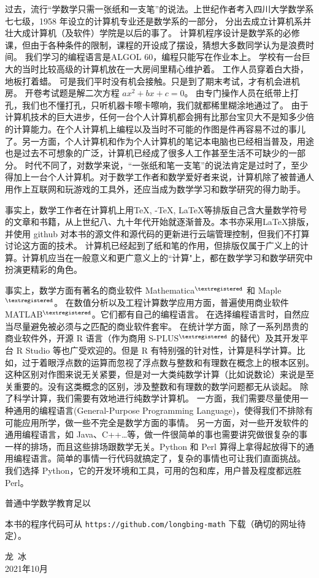 \documentclass[main.tex]{subfiles}
\begin{document}
过去，流行“学数学只需一张纸和一支笔”的说法。上世纪作者考入四川大学数学系七七级，1958 年设立的计算机专业还是数学系的一部分，
分出去成立计算机系并壮大成计算机（及软件）学院是以后的事了。
计算机程序设计是数学系的必修课，但由于各种条件的限制，课程的开设成了摆设，猜想大多数同学认为是浪费时间。
我们学习的编程语言是ALGOL 60，编程只能写在作业本上。
学校有一台巨大的当时比较高级的计算机放在一大房间里精心维护着。
工作人员穿着白大掛，地板打着蜡。
可是我们平时没有机会接触。只是到了期末考试，才有机会进机房。
开卷考试题是解二次方程 $ax^2+bx+c = 0$。
由专门操作人员在纸带上打孔，我们也不懂打孔，只听机器卡嚓卡嚓响，我们就都稀里糊涂地通过了。
由于计算机技术的巨大进步，任何一台个人计算机都会拥有比那台宝贝大不是知多少倍的计算能力。在个人计算机上编程以及当时不可能的作图是件再容易不过的事儿了。另一方面，个人计算机和作为个人计算机的笔记本电脑也已经相当普及，用途也是过去不可想象的广泛，计算机已经成了很多人工作甚至生活不可缺少的一部分。
时代不同了，对数学来说，“一张纸和笔一支笔”的说法肯定是过时了，至少得加上一台个人计算机。对于数学工作者和数学爱好者来说，计算机除了被普通人用作上互联网和玩游戏的工具外，还应当成为数学学习和数学研究的得力助手。

事实上，数学工作者在计算机上用\TeX, \AmS-\TeX, \LaTeX 等排版自己含大量数学符号的文章和书籍，从上世纪八、九十年代开始就逐渐普及。本书亦采用\LaTeX 排版， 并使用 github 对本书的源文件和源代码的更新进行云端管理控制，但我们不打算讨论这方面的技术。
计算机已经起到了纸和笔的作用，但排版仅属于广义上的计算。计算机应当在一般意义和更广意义上的“计算"上，都在数学学习和数学研究中扮演更精彩的角色。

事实上，数学方面有著名的商业软件 Mathematica${}^{\textregistered}$ 和 Maple${}^{\textregistered}$。
在数值分析以及工程计算数学应用方面，普遍使用商业软件 MATLAB${}^{\textregistered}$。它们都有自己的编程语言。
在选择编程语言时，自然应当尽量避免被必须与之匹配的商业软件套牢。
在统计学方面，除了一系列昂贵的商业软件外，开源 R 语言（作为商用 S-PLUS${}^{\textregistered}$ 的替代）及其开发平台 R Studio 等也广受欢迎的。但是 R 有特别强的针对性，计算是科学计算。比如，过于着眼浮点数的运算而忽视了浮点数与整数和有理数在概念上的根本区别。这种区别对作图来说无关紧要，但是对一大类纯数学计算（比如说数论）来说是至关重要的。没有这类概念的区别，涉及整数和有理数的数学问题都无从谈起。
除了科学计算，我们需要有效地进行纯数学计算机。
一方面，我们需要尽量使用一种通用的编程语言(General-Purpose Programming Language)，使得我们不排除有可能应用所学，做一些不完全是数学方面的事情。
另一方面，对一些开发软件的通用编程语言，如 Java、C++…等，做一件很简单的事也需要讲究做很复杂的事一样的排场，而且这些排场跟数学无关。Python 和 Perl 算得上拿得起放得下的通用编程语言。简单的事情一行代码就搞定了，复杂的事情也可让我们直面挑战。
我们选择 Python，它的开发环境和工具，可用的包和库，用户普及程度都远胜Perl。

普通中学数学教育足以


本书的程序代码可从 \verb|https://github.com/longbing-math| 下载（确切的网址待定）。


\begin{flushright}
	\centering
{\kaishu 龙\,  冰}\\
2021年10月
\end{flushright}
\end{document}
